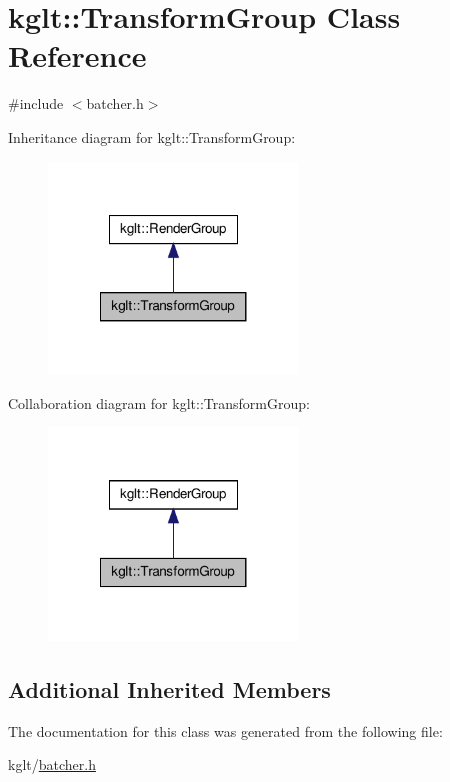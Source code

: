 \hypertarget{classkglt_1_1_transform_group}{\section{kglt\-:\-:Transform\-Group Class Reference}
\label{classkglt_1_1_transform_group}
}


{\ttfamily \#include $<$batcher.\-h$>$}



Inheritance diagram for kglt\-:\-:Transform\-Group\-:\nopagebreak
\begin{figure}[H]
\begin{center}
\leavevmode
\includegraphics[width=188pt]{classkglt_1_1_transform_group__inherit__graph}
\end{center}
\end{figure}


Collaboration diagram for kglt\-:\-:Transform\-Group\-:\nopagebreak
\begin{figure}[H]
\begin{center}
\leavevmode
\includegraphics[width=188pt]{classkglt_1_1_transform_group__coll__graph}
\end{center}
\end{figure}
\subsection*{Additional Inherited Members}


The documentation for this class was generated from the following file\-:\begin{DoxyCompactItemize}
\item 
kglt/\hyperlink{batcher_8h}{batcher.\-h}\end{DoxyCompactItemize}
